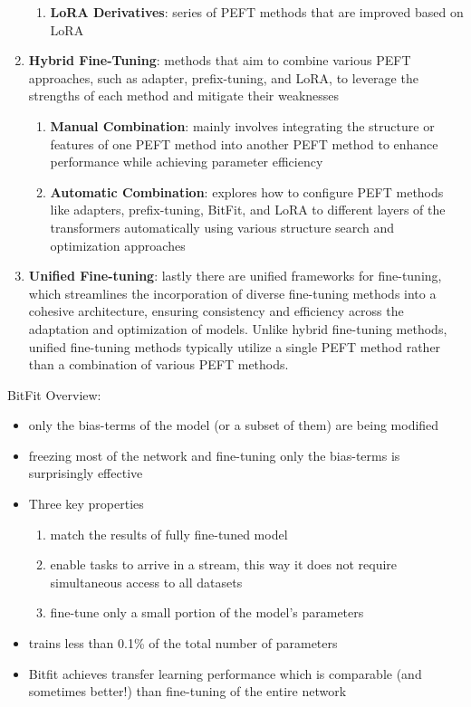 \begin{enumerate}
\begin{enumerate}
        \item \textbf{LoRA Derivatives}: series of PEFT methods that are improved based on LoRA
    \end{enumerate}
    \item \textbf{Hybrid Fine-Tuning}: methods that aim to combine various PEFT approaches, such as adapter, prefix-tuning, and LoRA, to leverage the strengths of each method and mitigate their weaknesses
    \begin{enumerate}
        \item \textbf{Manual Combination}: mainly involves integrating the structure or features of one PEFT method into another PEFT method to enhance performance while achieving parameter efficiency
        \item \textbf{Automatic Combination}: explores how to configure PEFT methods like adapters, prefix-tuning, BitFit, and LoRA to different layers of the transformers automatically using various structure search and optimization approaches
    \end{enumerate}
    \item \textbf{Unified Fine-tuning}: lastly there are unified frameworks for fine-tuning, which streamlines the incorporation of diverse fine-tuning methods into a cohesive architecture, ensuring consistency and efficiency across the adaptation and optimization of models. Unlike hybrid fine-tuning methods, unified fine-tuning methods typically utilize a single PEFT method rather than a combination of various PEFT methods.
\end{enumerate}


\noindent{} \cite{zaken2022bitfit} BitFit Overview:
\begin{itemize}
    \item only the bias-terms of the model (or a subset of them) are being modified
    \item  freezing most of the network and fine-tuning only the bias-terms is surprisingly effective
    \item Three key properties
    \begin{enumerate}
        \item match the results of fully fine-tuned model
        \item enable tasks to arrive in a stream, this way it does not require simultaneous access to all datasets
        \item  fine-tune only a small portion of the model’s parameters
    \end{enumerate}
    \item trains less than 0.1\% of the total number of parameters
    \item Bitfit achieves transfer learning performance which is comparable (and sometimes better!) than fine-tuning of the entire network
\end{itemize}


